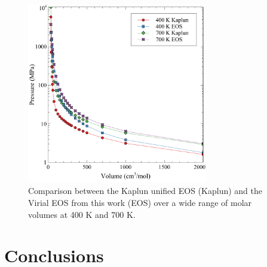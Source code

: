 \documentclass[review]{elsarticle}
\providecommand{\DIFaddbeginFL}{} %
\providecommand{\DIFaddendFL}{} %
\providecommand{\DIFdelbeginFL}{} %
\providecommand{\DIFdelendFL}{} %
\newcommand{\DIFscaledelfig}{0.5}
\newlength{\DIFdelgraphicswidth} %
\newlength{\DIFdelgraphicsheight} %
\newcommand{\DIFaddincludegraphics}[2][]{{\color{blue}\fbox{\DIFOincludegraphics[#1]{#2}}}} %
\newcommand{\DIFdelincludegraphics}[2][]{%
\sbox{\DIFdelgraphicsbox}{\DIFOincludegraphics[#1]{#2}}%
\settoboxwidth{\DIFdelgraphicswidth}{\DIFdelgraphicsbox} %
\settoboxtotalheight{\DIFdelgraphicsheight}{\DIFdelgraphicsbox} %
\scalebox{\DIFscaledelfig}{%
\parbox[b]{\DIFdelgraphicswidth}{\usebox{\DIFdelgraphicsbox}\\[-\baselineskip] \rule{\DIFdelgraphicswidth}{0em}}\llap{\resizebox{\DIFdelgraphicswidth}{\DIFdelgraphicsheight}{%
\setlength{\unitlength}{\DIFdelgraphicswidth}%
\begin{picture}(1,1)%
\thicklines\linethickness{2pt} %
{\color[rgb]{1,0,0}\put(0,0){\framebox(1,1){}}}%
{\color[rgb]{1,0,0}\put(0,0){\line( 1,1){1}}}%
{\color[rgb]{1,0,0}\put(0,1){\line(1,-1){1}}}%
\end{picture}%
}\hspace*{3pt}}} %
} %
\DeclareRobustCommand{\DIFaddbeginFL}{\DIFOaddbeginFL \let\includegraphics\DIFaddincludegraphics} %
\DeclareRobustCommand{\DIFaddendFL}{\DIFOaddendFL \let\includegraphics\DIFOincludegraphics} %
\DeclareRobustCommand{\DIFdelbeginFL}{\DIFOdelbeginFL \let\includegraphics\DIFdelincludegraphics} %
\DeclareRobustCommand{\DIFdelendFL}{\DIFOaddendFL \let\includegraphics\DIFOincludegraphics} %
\begin{document}
\begin{figure}[h!]
 \centering
 \DIFdelbeginFL %
\DIFdelendFL \DIFaddbeginFL \includegraphics[width=0.7\textwidth]{kaplun_comp} 
 \DIFaddendFL \caption{Comparison between the Kaplun unified EOS (Kaplun) and the Virial EOS from this work (EOS) over a wide range of molar volumes at 400 K and 700 K.}
 \label{fig:kap_comp}
\end{figure}


\FloatBarrier

\section{Conclusions}
\end{document}
